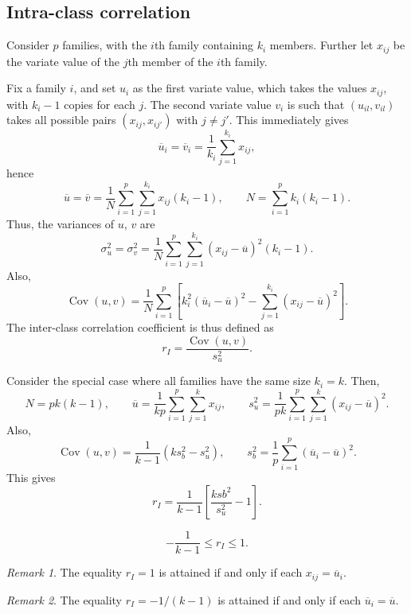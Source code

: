 \documentclass[11pt]{article}
\DeclareMathOperator{\cov}{Cov}
\theoremstyle{definition}
\theoremstyle{remark}
\newtheorem*{remark}{Remark}
\numberwithin{equation}{section}
\begin{document}
    \subsection{Intra-class correlation}

    Consider $p$ families, with the $i$th family containing $k_i$ members. Further
    let $x_{ij}$ be the variate value of the $j$th member of the $i$th family.

    Fix a family $i$, and set $u_i$ as the first variate value, which takes the
    values $x_{ij}$, with $k_i - 1$ copies for each $j$. The second variate value
    $v_i$ is such that $(u_{il}, v_{il})$ takes all possible pairs $(x_{ij},
    x_{ij'})$ with $j \neq j'$. This immediately gives \[
        \overline{u}_i = \overline{v}_i = \frac{1}{k_i} \sum_{j = 1}^{k_i} x_{ij},
    \] hence \[
        \overline{u} = \overline{v} = \frac{1}{N}\sum_{i = 1}^p\sum_{j = 1}^{k_i}
        x_{ij}(k_i - 1), \qquad N = \sum_{i = 1}^p k_i(k_i - 1).
    \] Thus, the variances of $u$, $v$ are \[
        \sigma_u^2 = \sigma_v^2 = \frac{1}{N}\sum_{i = 1}^p\sum_{j = 1}^{k_i} (x_{ij}
        - \overline{u})^2(k_i - 1).
    \] Also, \[
        \cov(u, v) = \frac{1}{N}\sum_{i = 1}^p\left[k_i^2(\overline{u}_i -
        \overline{u})^2 - \sum_{j = 1}^{k_i}(x_{ij} - \overline{u})^2\right].
    \] The inter-class correlation coefficient is thus defined as \[
        r_I = \frac{\cov(u, v)}{s_u^2}.
    \] 

    Consider the special case where all families have the same size $k_i = k$. Then,
    \[
        N = pk(k - 1), \qquad 
        \overline{u} = \frac{1}{kp}\sum_{i = 1}^p\sum_{j = 1}^kx_{ij}, \qquad 
        s_u^2 = \frac{1}{pk}\sum_{i = 1}^p\sum_{j = 1}^k(x_{ij} - \overline{u})^2.
    \] Also, \[
        \cov(u, v) = \frac{1}{k - 1}(ks_b^2 - s_u^2), \qquad
        s_b^2 = \frac{1}{p}\sum_{i = 1}^p (\overline{u}_i - \overline{u})^2.
    \] This gives \[
        r_I = \frac{1}{k - 1}\left[\frac{ksb^2}{s_u^2} - 1\right].
    \]

    \begin{lemma}
        \[
            -\frac{1}{k - 1} \leq r_I \leq 1.
        \]
        \begin{remark}
            The equality $r_I = 1$ is attained if and only if each $x_{ij} =
            \overline{u}_i$.
        \end{remark}
        \begin{remark}
            The equality $r_I = -1 / (k - 1)$ is attained if and only if each
            $\overline{u}_i = \overline{u}$.
        \end{remark}
    \end{lemma}
    
\end{document}
